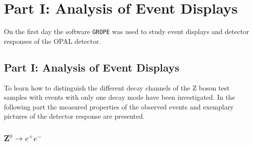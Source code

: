\documentclass[11pt, a4paper]{article}
\numberwithin{equation}{section}
\begin{document}
\section{Part I: Analysis of Event Displays}

On the first day the software \texttt{GROPE} was used to study event displays and detector responses of the OPAL detector.

\subsection{Part I: Analysis of Event Displays}

To learn how to distinguish the different decay channels of the Z boson test samples with events with only one decay mode have been investigated.
In the following part the measured properties of the observed events and exemplary pictures of the detector response are presented.
\clearpage
\subsubsection{Z$^0\rightarrow e^+e^-$}
\end{document}
